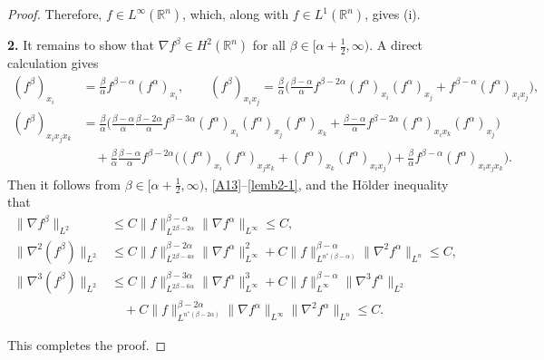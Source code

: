 \documentclass[11pt,reqno]{amsart}
\numberwithin{rk}{section}
\numberwithin{prop}{section}
\numberwithin{mydef}{section}
\numberwithin{lem}{section}
\numberwithin{equation}{section}
\numberwithin{thm}{section}
\begin{document}
\begin{proof}
Therefore,  $f\in L^\infty(\mathbb{R}^n)$, which, along with $f\in L^1(\mathbb{R}^n)$, gives (i).

\smallskip
\textbf{2.} It remains to show that $\nabla f^\beta\in  H^2(\mathbb{R}^n)$  for all $\beta\in[\alpha+\frac{1}{2},\infty)$. A direct calculation gives 
\begin{equation*}
\begin{aligned}
(f^\beta)_{x_i} &= \frac{\beta}{\alpha} f^{\beta-\alpha} (f^\alpha)_{x_i},\qquad (f^\beta)_{x_ix_j}=\frac{\beta}{\alpha}\Big(\frac{\beta-\alpha}{\alpha} f^{\beta-2\alpha} (f^\alpha)_{x_i} (f^\alpha)_{x_j}+ f^{\beta-\alpha}(f^\alpha)_{x_ix_j}\Big),\\
(f^\beta)_{x_ix_jx_k}&=\frac{\beta}{\alpha}\Big(\frac{\beta-\alpha}{\alpha}\frac{\beta-2\alpha}{\alpha}f^{\beta-3\alpha} (f^\alpha)_{x_i} (f^\alpha)_{x_j}(f^\alpha)_{x_k}+\frac{\beta-\alpha}{\alpha} f^{\beta-2\alpha} (f^\alpha)_{x_ix_k} (f^\alpha)_{x_j}\Big)\\
&\quad+ \frac{\beta}{\alpha}\frac{\beta-\alpha}{\alpha}f^{\beta-2\alpha}\Big( (f^\alpha)_{x_i} (f^\alpha)_{x_jx_k}+ (f^\alpha)_{x_k} (f^\alpha)_{x_ix_j}\big)+ \frac{\beta}{\alpha} f^{\beta-\alpha} (f^\alpha)_{x_ix_jx_k}\Big). 
\end{aligned}
\end{equation*}
Then it follows from $\beta\in [\alpha+\frac{1}{2},\infty)$, \eqref{A13}--\eqref{lemb2-1}, and  the H\"older inequality that 
\begin{align*}
\|\nabla f^\beta \|_{L^2}&\leq C\|f\|^{\beta-\alpha}_{L^{2\beta-2\alpha}} \|\nabla f^\alpha\|_{L^{\infty}}\leq C,\\
\|\nabla^2 (f^\beta)\|_{L^2}&\leq C \|f\|_{L^{2\beta-4\alpha}}^{\beta-2\alpha}\|\nabla f^\alpha\|_{L^{\infty}}^2  +C \|f\|_{L^{n^*(\beta-\alpha)}}^{\beta-\alpha} \|\nabla^2 f^\alpha\|_{L^{n}} \leq C,\\
\|\nabla^3 (f^\beta)\|_{L^2}&\leq C \|f\|_{L^{2\beta-6\alpha}}^{\beta-3\alpha}\|\nabla f^\alpha\|_{L^{\infty}}^3 +C \|f\|_{L^{\infty}}^{\beta-\alpha} \|\nabla^3 f^\alpha\|_{L^{2}} \\
&\quad +C \|f\|_{L^{n^*(\beta-2\alpha)}}^{\beta-2\alpha}\|\nabla f^\alpha\|_{L^{\infty}} \|\nabla^2 f^\alpha\|_{L^{n}}\leq C.
\end{align*} 


This completes the proof.
\end{proof}


 
\end{document}

